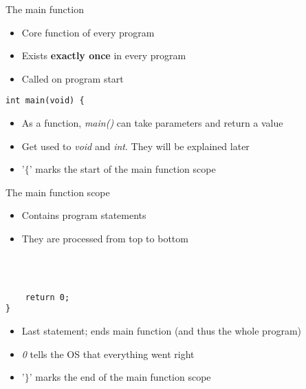\begin{frame}[fragile = singleslide]{The main function}
	\begin{itemize}
		\item Core function of every program
		\item Exists \textbf{exactly once} in every program
		\item Called on program start
	\end{itemize}
	\begin{lstlisting}
int main(void) {
\end{lstlisting}
	\begin{itemize}
		\item As a function, \textit{main()} can take parameters and return a value
		\item Get used to \textit{void} and \textit{int}. They will be explained later
		\item '$\lbrace$' marks the start of the main function scope
	\end{itemize}
\end{frame}

\begin{frame}[fragile = singleslide]{The main function scope}
	\begin{itemize}
		\item Contains program statements
		\item They are processed from top to bottom
	\end{itemize} \ \\
	\ \\
	\begin{lstlisting}
	return 0;
}
\end{lstlisting}
	\begin{itemize}
		\item Last statement; ends main function (and thus the whole program)
		\item \textit{0} tells the OS that everything went right
		\item '$\rbrace$' marks the end of the main function scope
	\end{itemize}
\end{frame}

